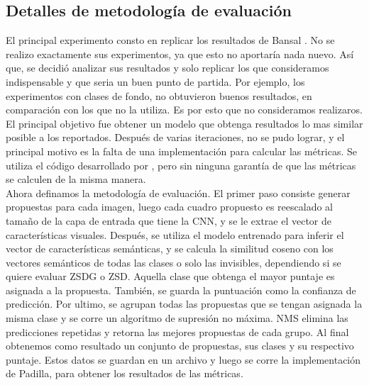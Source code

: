\subsection{Detalles de metodología de evaluación} \label{ssec:detallesdemetodologiadeevaluacion}
El principal experimento consto en replicar los resultados de Bansal \cite{bansal2018zero}. No se realizo exactamente sus experimentos, ya que esto no aportaría nada nuevo. Así que, se decidió analizar sus resultados y solo replicar los que consideramos indispensable y que seria un buen punto de partida. Por ejemplo, los experimentos con clases de fondo, no obtuvieron buenos resultados, en comparación con los que no la utiliza. Es por esto que no consideramos realizaros. El principal objetivo fue obtener un modelo que obtenga resultados lo mas similar posible a los reportados. Después de varias iteraciones, no se pudo lograr, y el principal motivo es la falta de una implementación para calcular las métricas. Se utiliza el código desarrollado por \cite{padilla2020survey}, pero sin ninguna garantía de que las métricas se calculen de la misma manera.\\

Ahora definamos la metodología de evaluación. El primer paso consiste generar propuestas para cada imagen, luego cada cuadro propuesto es reescalado al tamaño de la capa de entrada que tiene la CNN, y se le extrae el vector de características visuales. Después, se utiliza el modelo entrenado para inferir el vector de características semánticas, y se calcula la similitud coseno con los vectores semánticos de todas las clases o solo las invisibles, dependiendo si se quiere evaluar ZSDG o ZSD. Aquella clase que obtenga el mayor puntaje es asignada a la propuesta. También, se guarda la puntuación como la confianza de predicción.  Por ultimo, se agrupan todas las propuestas que se tengan asignada la misma clase y se corre un algoritmo de supresión no máxima. NMS elimina las predicciones repetidas y retorna las mejores propuestas de cada grupo. Al final obtenemos como resultado un conjunto de propuestas, sus clases y su respectivo puntaje. Estos datos se guardan en un archivo y luego se corre la implementación de Padilla, para obtener los resultados de las métricas.\\
